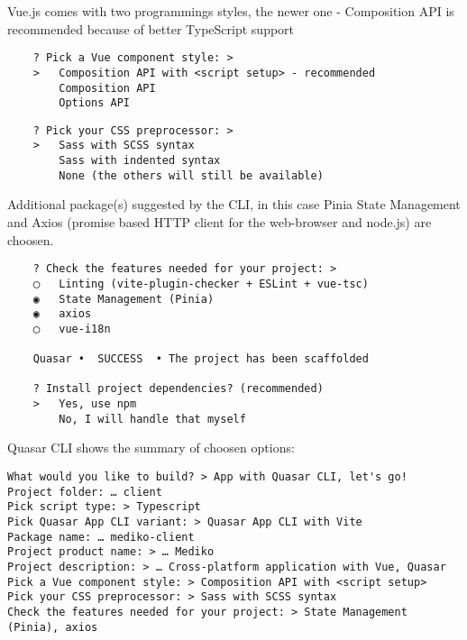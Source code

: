 Vue.js comes with two programmings styles, the newer one - Composition API is recommended because of better TypeScript support \autocite{VueAPIStyles}
\begin{verbatim}
    ? Pick a Vue component style: > 
    >   Composition API with <script setup> - recommended
        Composition API
        Options API

\end{verbatim}

\begin{verbatim}
    ? Pick your CSS preprocessor: > 
    >   Sass with SCSS syntax
        Sass with indented syntax
        None (the others will still be available)
\end{verbatim}

Additional package(s) suggested by the CLI, in this case Pinia State Management and Axios (promise based HTTP client for the web-browser and node.js) are choosen.
\begin{verbatim}
    ? Check the features needed for your project: >  
    ◯   Linting (vite-plugin-checker + ESLint + vue-tsc)
    ◉   State Management (Pinia)
    ◉   axios
    ◯   vue-i18n
    
    Quasar •  SUCCESS  • The project has been scaffolded

    ? Install project dependencies? (recommended)
    >   Yes, use npm
        No, I will handle that myself 

\end{verbatim}
    

Quasar CLI shows the summary of choosen options:

\begin{verbatim}
What would you like to build? > App with Quasar CLI, let's go!
Project folder: … client
Pick script type: > Typescript
Pick Quasar App CLI variant: > Quasar App CLI with Vite
Package name: … mediko-client
Project product name: > … Mediko
Project description: > … Cross-platform application with Vue, Quasar
Pick a Vue component style: > Composition API with <script setup>
Pick your CSS preprocessor: > Sass with SCSS syntax
Check the features needed for your project: > State Management (Pinia), axios
\end{verbatim}

\section{}%
\label{sec:webclient}

